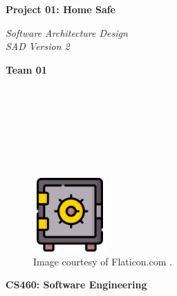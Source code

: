 \documentclass{article}
\begin{document}
\begin{titlepage}
\begin{center}
\vspace*{1cm}

\Huge
\textbf{Project 01: Home Safe}

\vspace{0.5cm}
\Large
\textit{Software Architecture Design} \\
\textit{SAD Version 2}

\vspace{1cm}

\textbf{Team 01}

\vspace{0.5cm}

 \\
 \\
 \\
 \\
 \\
 \\

\vspace{1cm}

\begin{figure}[h]
    \centering
    \includegraphics[width=0.25\textwidth]{docs/figs/safe.png}
    \caption*{Image courtesy of Flaticon.com \cite{flaticonSafeDeposit}.}
    \label{fig:safeIcon}
\end{figure}

\vspace{7cm}

\Large
\textbf{CS460: Software Engineering} \\

\end{center}
\end{titlepage}

\newpage

\tableofcontents

\newpage
\end{document}
